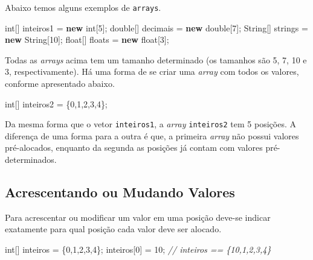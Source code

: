 \documentclass[
]{book}
\newenvironment{Shaded}{\begin{snugshade}}{\end{snugshade}}
\newcommand{\BuiltInTok}[1]{#1}
\newcommand{\CommentTok}[1]{\textcolor[rgb]{0.56,0.35,0.01}{\textit{#1}}}
\newcommand{\DataTypeTok}[1]{\textcolor[rgb]{0.13,0.29,0.53}{#1}}
\newcommand{\DecValTok}[1]{\textcolor[rgb]{0.00,0.00,0.81}{#1}}
\newcommand{\KeywordTok}[1]{\textcolor[rgb]{0.13,0.29,0.53}{\textbf{#1}}}
\newcommand{\NormalTok}[1]{#1}
\begin{document}
Abaixo temos alguns exemplos de \texttt{arrays}.

\begin{Shaded}
\begin{Highlighting}[]
\DataTypeTok{int}\NormalTok{[] inteiros1 = }\KeywordTok{new} \DataTypeTok{int}\NormalTok{[}\DecValTok{5}\NormalTok{];}
\DataTypeTok{double}\NormalTok{[] decimais = }\KeywordTok{new}  \DataTypeTok{double}\NormalTok{[}\DecValTok{7}\NormalTok{];}
\BuiltInTok{String}\NormalTok{[] strings = }\KeywordTok{new} \BuiltInTok{String}\NormalTok{[}\DecValTok{10}\NormalTok{];}
\DataTypeTok{float}\NormalTok{[] floats = }\KeywordTok{new} \DataTypeTok{float}\NormalTok{[}\DecValTok{3}\NormalTok{];}
\end{Highlighting}
\end{Shaded}

Todas as \emph{arrays} acima tem um tamanho determinado (os tamanhos são 5, 7, 10 e 3, respectivamente). Há uma forma de se criar uma \emph{array} com todos os valores, conforme apresentado abaixo.

\begin{Shaded}
\begin{Highlighting}[]
\DataTypeTok{int}\NormalTok{[] inteiros2 = \{}\DecValTok{0}\NormalTok{,}\DecValTok{1}\NormalTok{,}\DecValTok{2}\NormalTok{,}\DecValTok{3}\NormalTok{,}\DecValTok{4}\NormalTok{\};}
\end{Highlighting}
\end{Shaded}

Da mesma forma que o vetor \texttt{inteiros1}, a \emph{array} \texttt{inteiros2} tem 5 posições. A diferença de uma forma para a outra é que, a primeira \emph{array} não possui valores pré-alocados, enquanto da segunda as posições já contam com valores pré-determinados.

\hypertarget{acrescentando-ou-mudando-valores}{%
\subsection{Acrescentando ou Mudando Valores}\label{acrescentando-ou-mudando-valores}}

Para acrescentar ou modificar um valor em uma posição deve-se indicar exatamente para qual posição cada valor deve ser alocado.

\begin{Shaded}
\begin{Highlighting}[]
\DataTypeTok{int}\NormalTok{[] inteiros = \{}\DecValTok{0}\NormalTok{,}\DecValTok{1}\NormalTok{,}\DecValTok{2}\NormalTok{,}\DecValTok{3}\NormalTok{,}\DecValTok{4}\NormalTok{\};}
\NormalTok{inteiros[}\DecValTok{0}\NormalTok{] = }\DecValTok{10}\NormalTok{;}
\CommentTok{// inteiros == \{10,1,2,3,4\}}
\end{Highlighting}
\end{Shaded}
\end{document}
